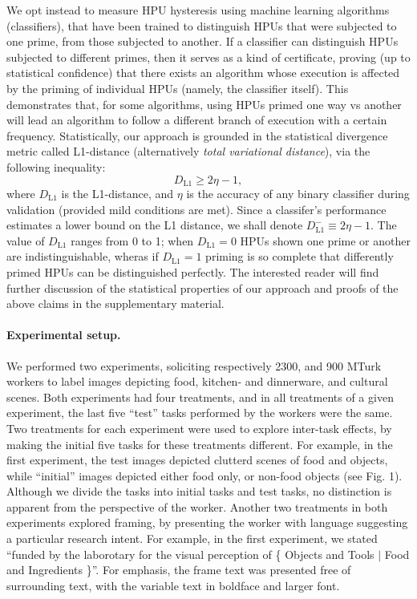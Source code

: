 \documentclass[12pt]{article}
\begin{document}
We opt instead to measure HPU hysteresis using
machine learning algorithms (classifiers), that have been trained to 
distinguish HPUs that were subjected to one prime, from those subjected to 
another.  If a classifier
can distinguish HPUs subjected to different primes, then it serves as 
a kind of certificate, proving 
(up to statistical confidence) that there exists 
an algorithm whose execution is affected by the priming of individual HPUs
(namely, the classifier itself).  This demonstrates that, for some algorithms,
using HPUs primed one way vs another will lead an algorithm to follow a 
different branch of execution with a certain frequency.
Statistically, our approach is grounded in the 
statistical divergence metric called L1-distance 
(alternatively \textit{total variational distance}), via the following 
inequality:
\begin{equation}
	D_\mathrm{L1} \geq 2 \eta - 1, 
	\label{l1}
\end{equation}
where $D_\mathrm{L1}$ is the L1-distance, and $\eta$ is the accuracy of
any binary classifier during validation (provided mild conditions are met). 
Since a classifer's performance estimates
a lower bound on the L1 distance, we shall denote 
$D_\mathrm{L1}^-\equiv 2\eta-1$.
The value of $D_\mathrm{L1}$ ranges from 0 to 1; when $D_\mathrm{L1} = 0$ HPUs 
shown one prime or another are 
indistinguishable, wheras if $D_\mathrm{L1} = 1$ priming is so complete that 
differently primed HPUs can be distinguished perfectly.
The
interested reader will find further discussion of the statistical properties
of our approach and proofs of the above claims in the supplementary material.

\paragraph{Experimental setup.}
We performed two experiments, soliciting respectively 2300, and 900 MTurk 
workers to label images depicting food, kitchen- and dinnerware, and cultural
scenes.  Both experiments had four treatments, and in all treatments of a 
given experiment, the last five ``test'' tasks performed by the workers were 
the same.  Two treatments for each experiment were used to explore inter-task 
effects, by making the initial five tasks for these treatments different.  
For example, in the first 
experiment, the test images depicted clutterd scenes of food and objects,
while ``initial'' images depicted either food only, or non-food objects 
(see Fig. 1).  Although we divide the tasks into initial tasks and test tasks,
no distinction is apparent from the perspective of the worker. Another two 
treatments in both experiments explored framing, 
by presenting the worker with language suggesting a particular research 
intent.  For example, in the first experiment, we stated 
``funded by the laborotary for the visual perception of \{ Objects and Tools 
$\vert$ Food and Ingredients \}''.  For emphasis, the frame text was presented
free of surrounding text, with the variable text in boldface and larger font. 
\end{document}
